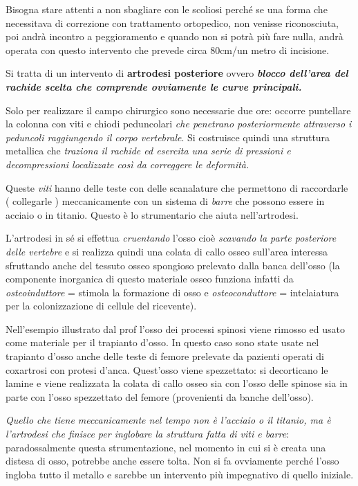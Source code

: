 Bisogna stare attenti a non sbagliare con le scoliosi perché se una forma che necessitava di correzione con trattamento ortopedico, non venisse riconosciuta, poi andrà incontro a peggioramento e quando non si potrà più fare nulla, andrà operata con questo intervento che prevede circa 80cm/un metro di incisione.

Si tratta di un intervento di \textbf{artrodesi posteriore} ovvero \textbf{\emph{blocco dell'area del rachide scelta che comprende ovviamente le curve principali. }}

Solo per realizzare il campo chirurgico sono necessarie due ore: occorre puntellare la colonna con viti e chiodi peduncolari \emph{che penetrano posteriormente attraverso i peduncoli raggiungendo il corpo vertebrale}.
Si costruisce quindi una struttura metallica che \emph{traziona il rachide ed esercita una serie di pressioni e decompressioni localizzate così da correggere le deformità.}

Queste \emph{viti} hanno delle teste con delle scanalature che permettono di raccordarle ( collegarle ) meccanicamente con un sistema di \emph{barre} che possono essere in acciaio o in titanio. Questo è lo strumentario che aiuta nell'artrodesi.

L'artrodesi in sé si effettua \emph{cruentando} l'osso cioè
\emph{scavando la parte posteriore delle vertebre} e si realizza quindi una colata di callo osseo sull'area interessa sfruttando anche del tessuto osseo spongioso prelevato dalla banca dell'osso (la componente inorganica di questo materiale osseo funziona infatti da \emph{osteoinduttore} = stimola la formazione di osso e \emph{osteoconduttore} = intelaiatura per la colonizzazione di cellule del ricevente).

Nell'esempio illustrato dal prof l'osso dei processi spinosi viene rimosso ed usato come materiale per il trapianto d'osso. In questo caso sono state usate nel trapianto d'osso anche delle teste di femore prelevate da pazienti operati di coxartrosi con protesi d'anca.
Quest'osso viene spezzettato: si decorticano le lamine e viene realizzata la colata di callo osseo sia con l'osso delle spinose sia in parte con l'osso spezzettato del femore (provenienti da banche dell'osso).

\emph{Quello che tiene meccanicamente nel tempo non è l'acciaio o il titanio, ma è l'artrodesi che finisce per inglobare la struttura fatta di viti e barre}: paradossalmente questa strumentazione, nel momento in
cui si è creata una distesa di osso, potrebbe anche essere tolta. Non si fa ovviamente perché l'osso ingloba tutto il metallo e sarebbe un intervento più impegnativo di quello iniziale.


